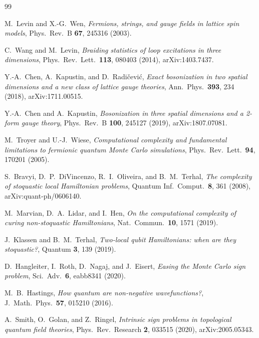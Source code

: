 \documentclass[11pt]{article}
\begin{document}
\begin{thebibliography}{99}\small

M.~Levin and X.-G.~Wen,
\emph{Fermions, strings, and gauge fields in lattice spin models},
Phys.\ Rev.\ B \textbf{67}, 245316 (2003).

C.~Wang and M.~Levin,
\emph{Braiding statistics of loop excitations in three dimensions},
Phys.\ Rev.\ Lett.\ \textbf{113}, 080403 (2014), arXiv:1403.7437.

Y.-A.~Chen, A.~Kapustin, and D.~Radi\v{c}evi\'c,
\emph{Exact bosonization in two spatial dimensions and a new class of lattice
gauge theories}, Ann.\ Phys.\ \textbf{393}, 234 (2018), arXiv:1711.00515.

Y.-A.~Chen and A.~Kapustin,
\emph{Bosonization in three spatial dimensions and a 2-form gauge theory},
Phys.\ Rev.\ B \textbf{100}, 245127 (2019), arXiv:1807.07081.

M.~Troyer and U.-J.~Wiese,
\emph{Computational complexity and fundamental limitations to fermionic
quantum Monte Carlo simulations},
Phys.\ Rev.\ Lett.\ \textbf{94}, 170201 (2005).

S.~Bravyi, D.~P.~DiVincenzo, R.~I.~Oliveira, and B.~M.~Terhal,
\emph{The complexity of stoquastic local Hamiltonian problems},
Quantum Inf.\ Comput.\ \textbf{8}, 361 (2008), arXiv:quant-ph/0606140.

M.~Marvian, D.~A.~Lidar, and I.~Hen,
\emph{On the computational complexity of curing non-stoquastic Hamiltonians},
Nat.\ Commun.\ \textbf{10}, 1571 (2019).

J.~Klassen and B.~M.~Terhal,
\emph{Two-local qubit Hamiltonians: when are they stoquastic?},
Quantum \textbf{3}, 139 (2019).

D.~Hangleiter, I.~Roth, D.~Nagaj, and J.~Eisert,
\emph{Easing the Monte Carlo sign problem},
Sci.\ Adv.\ \textbf{6}, eabb8341 (2020).

M.~B.~Hastings,
\emph{How quantum are non-negative wavefunctions?},
J.\ Math.\ Phys.\ \textbf{57}, 015210 (2016).

A.~Smith, O.~Golan, and Z.~Ringel,
\emph{Intrinsic sign problems in topological quantum field theories},
Phys.\ Rev.\ Research \textbf{2}, 033515 (2020), arXiv:2005.05343.


\end{thebibliography}
\end{document}
